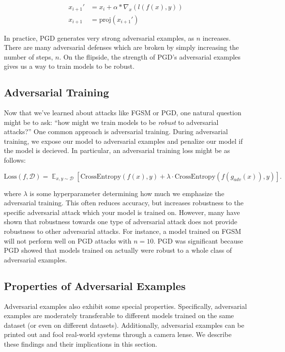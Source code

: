 \documentclass{article}
\DeclareMathOperator*{\E}{\mathbb{E}}
\newcommand{\D}{\mathcal{D}}
\newcommand{\proj}{\text{proj}}
\begin{document}
\begin{align}
    x_{i+1}' &= x_i + \alpha * \nabla_x(l(f(x), y)) \\
    x_{i+1} &= \proj(x_{i+1}')
\end{align}

In practice, PGD generates very strong adversarial examples, as $n$ increases. There are many adversarial defenses which are broken by simply increasing the number of steps, $n$. On the flipside, the strength of PGD's adversarial examples gives us a way to train models to be robust.

\subsection{Adversarial Training}
\label{sub:training}

Now that we've learned about attacks like FGSM or PGD, one natural question might be to ask: ``how might we train models to be \textit{robust} to adversarial attacks?'' One common approach is adversarial training. During adversarial training, we expose our model to adversarial examples and penalize our model if the model is decieved. In particular, an adversarial training loss might be as follows:

\[
    \text{Loss}(f, \D) = \E_{x,y \sim \D}\left[\text{CrossEntropy}(f(x), y) + \lambda \cdot \text{CrossEntropy}(f(g_{adv}(x)), y)\right].
\]

\noindent where $\lambda$ is some hyperparameter determining how much we emphasize the adversarial training. This often reduces accuracy, but increases robustness to the specific adversarial attack which your model is trained on. However, many have shown that robustness towards one type of adversarial attack does not provide robustness to other adversarial attacks. For instance, a model trained on FGSM will not perform well on PGD attacks with $n=10$. PGD was significant because PGD showed that models trained on actually were robust to a whole class of adversarial examples.

\subsection{Properties of Adversarial Examples}
\label{sub:prop}
Adversarial examples also exhibit some special properties. Specifically, adversarial examples are moderately transferable to different models trained on the same dataset (or even on different datasets). Additionally, adversarial examples can be printed out and fool real-world systems through a camera lense. We describe these findings and their implications in this section. 
\end{document}
